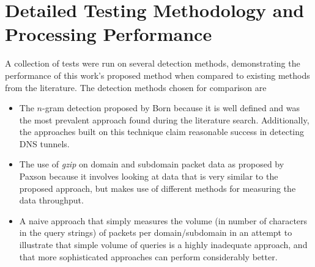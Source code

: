 \documentclass{llncs}
\begin{document}
%

\section{Detailed Testing Methodology and Processing Performance}
A collection of tests were run on several detection methods, demonstrating the
performance of this work's proposed method when compared to existing methods
from the literature. The detection methods chosen for comparison are

\label{chosen-methods}
\begin{itemize}

\item The $n$-gram detection proposed by Born\cite{Born2010.cfa} because it is
well defined and was the most prevalent approach found during the literature
search. Additionally, the approaches built on this technique claim reasonable
success in detecting DNS tunnels.

\item The use of \emph{gzip} on domain and subdomain packet data as proposed by
Paxson\cite{Paxson2011} because it involves looking at data that is very similar
to the proposed approach, but makes use of
different methods for measuring the data throughput.

\item A naive approach that simply measures the volume (in number of characters
in the query strings) of packets per domain/subdomain in an attempt to
illustrate that simple volume of queries is a highly inadequate approach, and
that more sophisticated approaches can perform considerably better.
\end{itemize}
\end{document}
